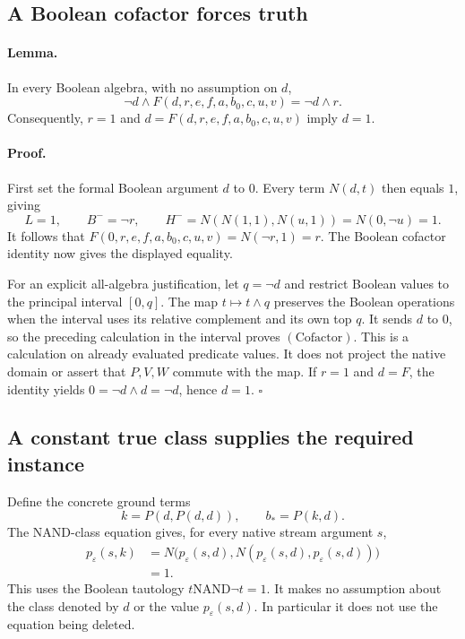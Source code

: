 \subsection{A Boolean cofactor forces truth}

\paragraph{Lemma.}
In every Boolean algebra, with no assumption on $d$,
\[
 \neg d\wedge F(d,r,e,f,a,b_0,c,u,v)=\neg d\wedge r.
 \tag{Cofactor}
\]
Consequently, $r=1$ and $d=F(d,r,e,f,a,b_0,c,u,v)$ imply $d=1$.

\paragraph{Proof.}
First set the formal Boolean argument $d$ to $0$. Every term $N(d,t)$
then equals $1$, giving
\[
 L=1,\qquad B^-=\neg r,\qquad
 H^-=N(N(1,1),N(u,1))=N(0,\neg u)=1.
\]
It follows that $F(0,r,e,f,a,b_0,c,u,v)=N(\neg r,1)=r$.
The Boolean cofactor identity now gives the displayed equality.

For an explicit all-algebra justification, let $q=\neg d$ and restrict
Boolean values to the principal interval $[0,q]$. The map
$t\mapsto t\wedge q$ preserves the Boolean operations when the interval
uses its relative complement and its own top $q$. It sends $d$ to $0$,
so the preceding calculation in the interval proves $(\mathrm{Cofactor})$.
This is a calculation on already evaluated predicate values. It does not
project the native domain or assert that $P,V,W$ commute with the map.
If $r=1$ and $d=F$, the identity yields
$0=\neg d\wedge d=\neg d$, hence $d=1$.
\hfill$\square$

\subsection{A constant true class supplies the required instance}

Define the concrete ground terms
\[
              k=P(d,P(d,d)),\qquad b_*=P(k,d).
\]
The NAND-class equation gives, for every native stream argument $s$,
\begin{align*}
 p_\varepsilon(s,k)
 &=N\bigl(p_\varepsilon(s,d),
          N(p_\varepsilon(s,d),p_\varepsilon(s,d))\bigr)\\
 &=1.
\end{align*}
This uses the Boolean tautology $t\mathbin{\mathrm{NAND}}\neg t=1$.
It makes no assumption about the class denoted by $d$ or the value
$p_\varepsilon(s,d)$. In particular it does not use the equation being
deleted.

